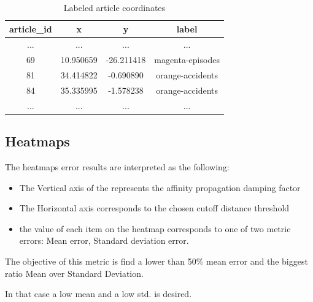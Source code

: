 \documentclass[ecp,tc,english]{iiufrgs}
\begin{document}
        \begin{table}[!ht]
            \centering
            \begin{tabular}{ |c|c|c|c| } 
                \hline
                article\_id & x & y & label \\
                \hline 
                ... & ... & ... & ... \\
                69 & 10.950659 & -26.211418 & magenta-episodes \\ 
                81 & 34.414822 & -0.690890 & orange-accidents \\ 
                84 & 35.335995 & -1.578238 & orange-accidents \\ 
                ... & ... & ... & ... \\
                \hline
            \end{tabular}
            \caption{Labeled article coordinates}
            \label{tab:article_coordinates_table}
        \end{table}
        
        \newpage 

        \subsection{Heatmaps}
    
        The heatmaps error results are interpreted as the following:
        \begin{itemize}
            \item The Vertical axis of the represents the affinity propagation damping factor
            \item The Horizontal axis corresponds to the chosen cutoff distance threshold
            \item the value of each item on the heatmap corresponds to one of two metric errors: Mean error, Standard deviation error.
        \end{itemize}
    
        The objective of this metric is find a lower than 50\% mean error and the biggest ratio Mean over Standard Deviation. 
    
        In that case a low mean and a low std. is desired.
        
\end{document}
